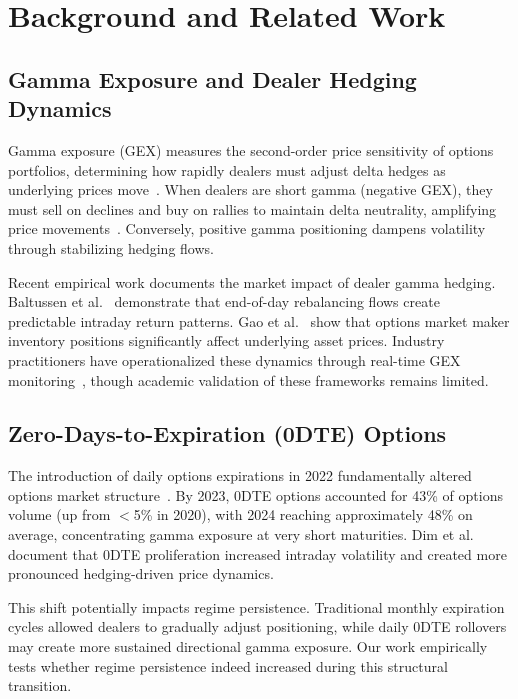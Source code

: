 \section{Background and Related Work}

\subsection{Gamma Exposure and Dealer Hedging Dynamics}

Gamma exposure (GEX) measures the second-order price sensitivity of options portfolios, determining how rapidly dealers must adjust delta hedges as underlying prices move~\cite{black1973pricing}. When dealers are short gamma (negative GEX), they must sell on declines and buy on rallies to maintain delta neutrality, amplifying price movements~\cite{ni2005stock}. Conversely, positive gamma positioning dampens volatility through stabilizing hedging flows.

Recent empirical work documents the market impact of dealer gamma hedging. Baltussen et al.~\cite{baltussen2021hedging} demonstrate that end-of-day rebalancing flows create predictable intraday return patterns. Gao et al.~\cite{gao2018market} show that options market maker inventory positions significantly affect underlying asset prices. Industry practitioners have operationalized these dynamics through real-time GEX monitoring~\cite{spotgamma2021,fishman2023gamma}, though academic validation of these frameworks remains limited.

\subsection{Zero-Days-to-Expiration (0DTE) Options}

The introduction of daily options expirations in 2022 fundamentally altered options market structure~\cite{cboe2024zero}. By 2023, 0DTE options accounted for 43\% of options volume (up from $<$5\% in 2020), with 2024 reaching approximately 48\% on average, concentrating gamma exposure at very short maturities. Dim et al.~\cite{dim2025zero} document that 0DTE proliferation increased intraday volatility and created more pronounced hedging-driven price dynamics.

This shift potentially impacts regime persistence. Traditional monthly expiration cycles allowed dealers to gradually adjust positioning, while daily 0DTE rollovers may create more sustained directional gamma exposure. Our work empirically tests whether regime persistence indeed increased during this structural transition.

